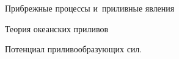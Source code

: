 \begin{chapter}{Прибрежные процессы и~приливные явления}
\begin{section}{Теория океанских приливов}
\begin{paragraph}{Потенциал приливообразующих сил.}


\end{paragraph}
\end{section}
\end{chapter}
